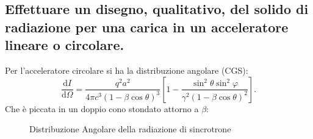 \subsection[]{Effettuare un disegno, qualitativo, del solido di radiazione per una carica in un acceleratore lineare o circolare.}
Per l'acceleratore circolare si ha la distribuzione angolare (CGS):
\[
	\frac{\mbox{d} I}{\mbox{d} \Omega} = \frac{q^2a^2}{4\pi c^3\left( 1-\beta\cos\theta \right) ^3} \left[ 1-\frac{\sin^2\theta\sin^2\varphi}{\gamma^2\left(1-\beta\cos\theta \right) ^2} \right] 	
.\]
Che è piccata in un doppio cono stondato attorno a $\beta$:
\begin{figure}[H]
    \centering
    \caption{Distribuzione Angolare della radiazione di sincrotrone}
    \label{fig:distribuzione-sincrotrone}
\end{figure}

